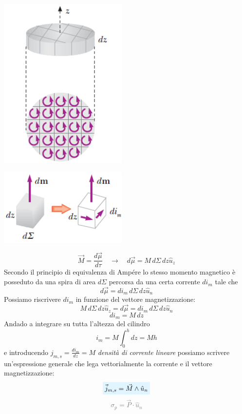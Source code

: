 \documentclass[x11names]{report}
\begin{document}
\begin{minipage}{0.33\textwidth}
	\begin{center}
		\includegraphics[scale=0.5]{img/materia_2.png}
	\end{center}
\end{minipage}
\begin{minipage}{0.33\textwidth}
	\begin{center}
		\includegraphics[scale=0.5]{img/materia_3.png}
	\end{center}
\end{minipage}
\vspace{0.5cm}
\[
\vec{M} = \frac{d\vec{\mu}}{d\tau} \quad \to \quad d\vec{\mu} = M \, d\Sigma \, dz \hat{u}_z
\]
Secondo il principio di equivalenza di Ampére lo stesso momento magnetico è posseduto da una spira di area \(d\Sigma\) percorsa da una certa corrente \(di_m\) tale che 
\[
d\vec{\mu} = di_m \, d\Sigma \, dz \hat{u}_n 
\]
Possiamo riscrivere \(di_m\) in funzione del vettore magnetizzazione:
\[
M \, d\Sigma \, dz \hat{u}_z=d\vec{\mu} = di_m \, d\Sigma \, dz \hat{u}_n 
\]
\[
di_m = M \, dz
\]
Andado a integrare su tutta l'altezza del cilindro
\[
i_m = M \int_{0}^{h} dz = Mh
\]
e introducendo \(j_{m,s} = \frac{di_m}{dz} = M\) \textit{densità di corrente lineare} possiamo scrivere un'espressione generale che lega vettorialmente la corrente e il vettore magnetizzazione:
\begin{equation}
	\viola{\vec{j}_{m,s} = \vec{M}\wedge\hat{u}_n} 
\end{equation}
\vspace{-0.4cm}
 \textcolor{gray}{\[
\sigma_p = \vec{P}\cdot\hat{u}_n
\]}
\end{document}
